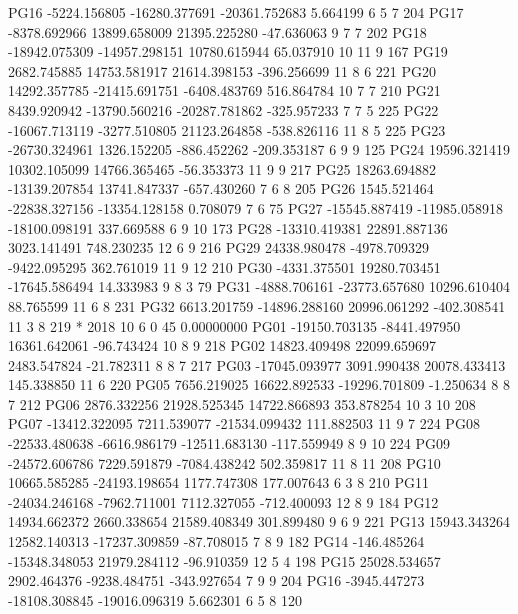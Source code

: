 PG16  -5224.156805 -16280.377691 -20361.752683      5.664199  6  5  7 204       
PG17  -8378.692966  13899.658009  21395.225280    -47.636063  9  7  7 202       
PG18 -18942.075309 -14957.298151  10780.615944     65.037910 10 11  9 167       
PG19   2682.745885  14753.581917  21614.398153   -396.256699 11  8  6 221       
PG20  14292.357785 -21415.691751  -6408.483769    516.864784 10  7  7 210       
PG21   8439.920942 -13790.560216 -20287.781862   -325.957233  7  7  5 225       
PG22 -16067.713119  -3277.510805  21123.264858   -538.826116 11  8  5 225       
PG23 -26730.324961   1326.152205   -886.452262   -209.353187  6  9  9 125       
PG24  19596.321419  10302.105099  14766.365465    -56.353373 11  9  9 217       
PG25  18263.694882 -13139.207854  13741.847337   -657.430260  7  6  8 205       
PG26   1545.521464 -22838.327156 -13354.128158      0.708079  7     6  75       
PG27 -15545.887419 -11985.058918 -18100.098191    337.669588  6  9 10 173       
PG28 -13310.419381  22891.887136   3023.141491    748.230235 12  6  9 216       
PG29  24338.980478  -4978.709329  -9422.095295    362.761019 11  9 12 210       
PG30  -4331.375501  19280.703451 -17645.586494     14.333983  9  8  3  79       
PG31  -4888.706161 -23773.657680  10296.610404     88.765599 11  6  8 231       
PG32   6613.201759 -14896.288160  20996.061292   -402.308541 11  3  8 219       
*  2018 10  6  0 45  0.00000000
PG01 -19150.703135  -8441.497950  16361.642061    -96.743424 10  8  9 218       
PG02  14823.409498  22099.659697   2483.547824    -21.782311  8  8  7 217       
PG03 -17045.093977   3091.990438  20078.433413    145.338850 11  6    220       
PG05   7656.219025  16622.892533 -19296.701809     -1.250634  8  8  7 212       
PG06   2876.332256  21928.525345  14722.866893    353.878254 10  3 10 208       
PG07 -13412.322095   7211.539077 -21534.099432    111.882503 11  9  7 224       
PG08 -22533.480638  -6616.986179 -12511.683130   -117.559949  8  9 10 224       
PG09 -24572.606786   7229.591879  -7084.438242    502.359817 11  8 11 208       
PG10  10665.585285 -24193.198654   1177.747308    177.007643  6  3  8 210       
PG11 -24034.246168  -7962.711001   7112.327055   -712.400093 12  8  9 184       
PG12  14934.662372   2660.338654  21589.408349    301.899480  9  6  9 221       
PG13  15943.343264  12582.140313 -17237.309859    -87.708015  7  8  9 182       
PG14   -146.485264 -15348.348053  21979.284112    -96.910359 12  5  4 198       
PG15  25028.534657   2902.464376  -9238.484751   -343.927654  7  9  9 204       
PG16  -3945.447273 -18108.308845 -19016.096319      5.662301  6  5  8 120       
